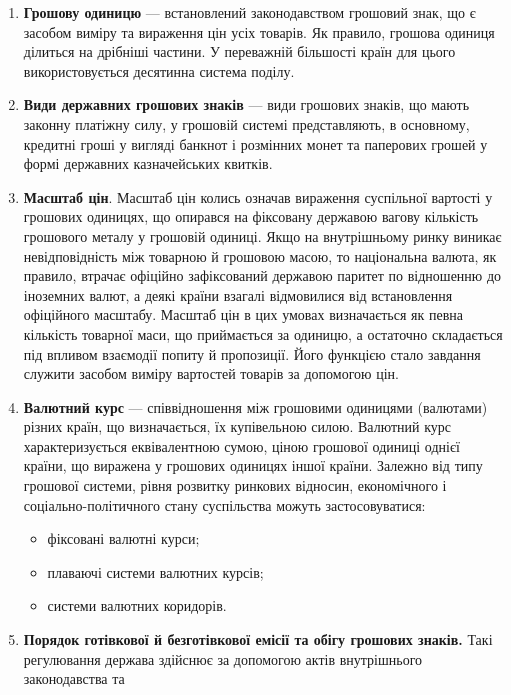 \documentclass[a4paper,12pt,notitlepage,pdftex,headsepline]{scrartcl}
\begin{document}
  \begin{enumerate}
    \item \textbf{Грошову одиницю} --- встановлений законодавством грошовий знак, що є
      засобом виміру та вираження цін усіх товарів.
      Як правило, грошова одиниця ділиться на дрібніші частини.
      У переважній більшості країн для цього використовується десятинна система поділу.
    \item \textbf{Види державних грошових знаків} --- види грошових знаків, що мають законну
      платіжну силу, у грошовій системі представляють, в основному, кредитні гроші у вигляді
      банкнот і розмінних монет та паперових грошей у формі державних казначейських
      квитків.
    \item \textbf{Масштаб цін}.
      Масштаб цін колись означав вираження суспільної вартості у грошових одиницях, що
      опирався на фіксовану державою вагову кількість грошового металу у грошовій одиниці.
      Якщо на внутрішньому ринку виникає невідповідність між товарною й грошовою масою, то
      національна валюта, як правило, втрачає офіційно зафіксований державою паритет по
      відношенню до іноземних валют, а деякі країни взагалі відмовилися від встановлення
      офіційного масштабу.
      Масштаб цін в цих умовах визначається як певна кількість товарної маси, що приймається
      за одиницю, а остаточно складається під впливом взаємодії попиту й пропозиції.
      Його функцією стало завдання служити засобом виміру вартостей товарів за допомогою
      цін.
    \item \textbf{Валютний курс} --- співвідношення між грошовими одиницями (валютами)
      різних країн, що визначається, їх купівельною силою.
      Валютний курс характеризується еквівалентною сумою, ціною грошової одиниці однієї
      країни, що виражена у грошових одиницях іншої країни.
      Залежно від типу грошової системи, рівня розвитку ринкових відносин, економічного і
      соціально-політичного стану суспільства можуть застосовуватися:
      \begin{itemize}
        \item фіксовані валютні курси;
        \item плаваючі системи валютних курсів;
        \item системи валютних коридорів.
      \end{itemize}
    \item \textbf{Порядок готівкової й безготівкової емісії та обігу грошових знаків.} Такі
      регулювання держава здійснює за допомогою актів внутрішнього законодавства та

\end{enumerate}
\end{document}

